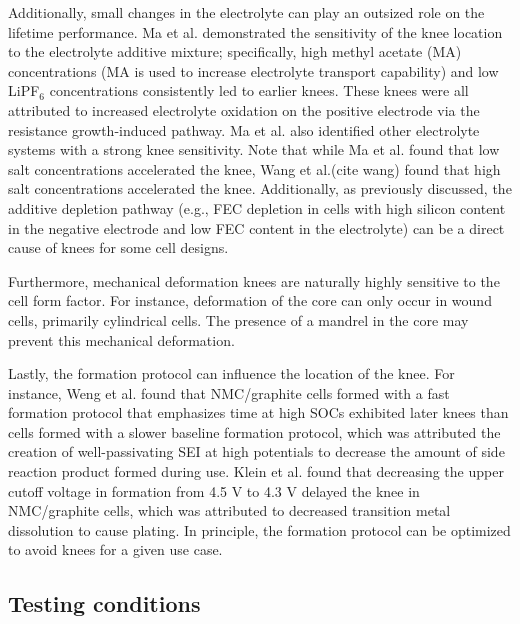 \documentclass[journal=jpclcd,manuscript=article]{achemso}
\begin{document}
Additionally, small changes in the electrolyte can play an outsized role on the lifetime performance. Ma et al.\cite{ma_editors_2019} demonstrated the sensitivity of the knee location to the electrolyte additive mixture; specifically, high methyl acetate (MA) concentrations (MA is used to increase electrolyte transport capability) and low LiPF$_6$ concentrations consistently led to earlier knees. These knees were all attributed to increased electrolyte oxidation on the positive electrode via the resistance growth-induced pathway. Ma et al.\cite{ma_editors_2019} also identified other electrolyte systems with a strong knee sensitivity.
Note that while Ma et al.\cite{ma_editors_2019} found that low salt concentrations accelerated the knee,
Wang et al.(cite wang) found that high salt concentrations accelerated the knee.
Additionally, as previously discussed, the additive depletion pathway (e.g., FEC depletion in cells with high silicon content in the negative electrode and low FEC content in the electrolyte) can be a direct cause of knees for some cell designs.\cite{petibon_studies_2016, jung_consumption_2016}

Furthermore, mechanical deformation knees are naturally highly sensitive to the cell form factor. For instance, deformation of the core \cite{pfrang_long-term_2018,carter_mechanical_2019,willenberg_development_2020} can only occur in wound cells, primarily cylindrical cells. The presence of a mandrel in the core may prevent this mechanical deformation.\cite{carter_mechanical_2019}

Lastly, the formation protocol can influence the location of the knee. For instance, Weng et al.\cite{weng_predicting_2021} found that NMC/graphite cells formed with a fast formation protocol that emphasizes time at high SOCs exhibited later knees than cells formed with a slower baseline formation protocol, which was attributed the creation of well-passivating SEI at high potentials to decrease the amount of side reaction product formed during use.\cite{attia_benefits_2021}
Klein et al.\cite{klein_demonstrating_2021} found that decreasing the upper cutoff voltage in formation from 4.5 V to 4.3 V delayed the knee in NMC/graphite cells, which was attributed to decreased transition metal dissolution to cause plating. In principle, the formation protocol can be optimized to avoid knees for a given use case. 


\subsection{Testing conditions}
\end{document}
